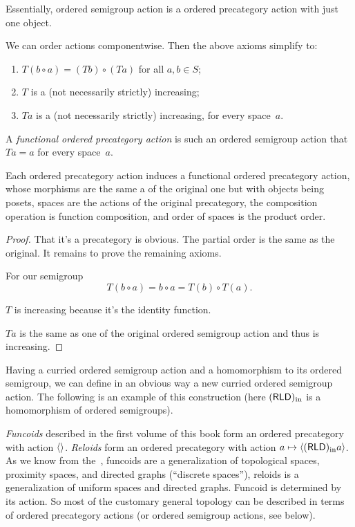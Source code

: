 Essentially, ordered semigroup action is a ordered precategory action with just one object.

We can order actions componentwise. Then the above axioms simplify to:
\begin{enumerate}
\item $T(b\circ a) = (Tb)\circ(Ta)$ for all $a,b\in S$;
\item $T$ is a (not necessarily strictly) increasing;
\item $Ta$ is a (not necessarily strictly) increasing, for every space~$a$.
\end{enumerate}

\begin{defn}
A \emph{functional ordered precategory action} is such an ordered semigroup action that $Ta=a$ for every space~$a$.
\end{defn}

\begin{thm}
Each ordered precategory action induces a functional ordered precategory action, whose morphisms are the same a of the original one but with objects being posets, spaces are the actions of the original precategory, the composition operation is function composition, and order of spaces is the product order.
\end{thm}

\begin{proof}
That it's a precategory is obvious. The partial order is the same as the original. It remains to prove the remaining axioms.

For our semigroup
\[ T(b\circ a) = b\circ a=T(b)\circ T(a). \]

$T$ is increasing because it's the identity function.

$Ta$ is the same as one of the original ordered semigroup action and thus is increasing.
\end{proof}

Having a curried ordered semigroup action and a homomorphism to its ordered semigroup, we can define in an obvious way a new curried ordered semigroup action. The following is an example of this construction (here $(\mathsf{RLD})_{\mathrm{in}}$ is a homomorphism of ordered semigroups).

\emph{Funcoids} described in the first volume of this book form an ordered precategory with action $\left\langle \right\rangle$. \emph{Reloids} form an ordered precategory with action $a\mapsto\left\langle (\mathsf{RLD})_{\mathrm{in}} a\right\rangle$.
As we know from the~\cite{volume-1}, funcoids are a generalization of topological spaces, proximity spaces, and directed graphs (``discrete spaces''), reloids is a generalization of uniform spaces and directed graphs. Funcoid is determined by its action. So most of the customary general topology can be described in terms of ordered precategory actions (or ordered semigroup actions, see below).

